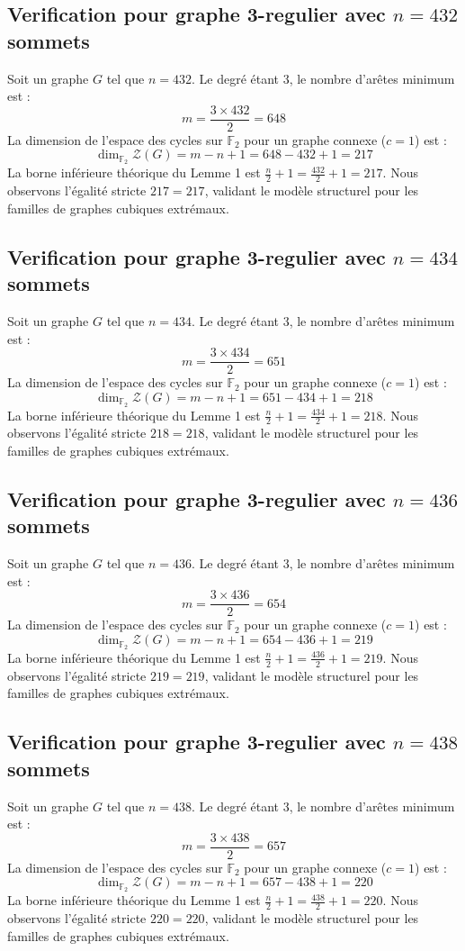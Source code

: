 \documentclass[11pt,a4paper]{article}
\begin{document}
\subsection{Verification pour graphe 3-regulier avec $n=432$ sommets}
Soit un graphe $G$ tel que $n = 432$. Le degré étant 3, le nombre d'arêtes minimum est :
$$ m = \frac{3 \times 432}{2} = 648 $$
La dimension de l'espace des cycles sur $\mathbb{F}_2$ pour un graphe connexe ($c=1$) est :
$$ \dim_{\mathbb{F}_2} \mathcal{Z}(G) = m - n + 1 = 648 - 432 + 1 = 217 $$
La borne inférieure théorique du Lemme 1 est $\frac{n}{2} + 1 = \frac{432}{2} + 1 = 217$.
Nous observons l'égalité stricte $217 = 217$, validant le modèle structurel pour les familles de graphes cubiques extrémaux.

\subsection{Verification pour graphe 3-regulier avec $n=434$ sommets}
Soit un graphe $G$ tel que $n = 434$. Le degré étant 3, le nombre d'arêtes minimum est :
$$ m = \frac{3 \times 434}{2} = 651 $$
La dimension de l'espace des cycles sur $\mathbb{F}_2$ pour un graphe connexe ($c=1$) est :
$$ \dim_{\mathbb{F}_2} \mathcal{Z}(G) = m - n + 1 = 651 - 434 + 1 = 218 $$
La borne inférieure théorique du Lemme 1 est $\frac{n}{2} + 1 = \frac{434}{2} + 1 = 218$.
Nous observons l'égalité stricte $218 = 218$, validant le modèle structurel pour les familles de graphes cubiques extrémaux.

\subsection{Verification pour graphe 3-regulier avec $n=436$ sommets}
Soit un graphe $G$ tel que $n = 436$. Le degré étant 3, le nombre d'arêtes minimum est :
$$ m = \frac{3 \times 436}{2} = 654 $$
La dimension de l'espace des cycles sur $\mathbb{F}_2$ pour un graphe connexe ($c=1$) est :
$$ \dim_{\mathbb{F}_2} \mathcal{Z}(G) = m - n + 1 = 654 - 436 + 1 = 219 $$
La borne inférieure théorique du Lemme 1 est $\frac{n}{2} + 1 = \frac{436}{2} + 1 = 219$.
Nous observons l'égalité stricte $219 = 219$, validant le modèle structurel pour les familles de graphes cubiques extrémaux.

\subsection{Verification pour graphe 3-regulier avec $n=438$ sommets}
Soit un graphe $G$ tel que $n = 438$. Le degré étant 3, le nombre d'arêtes minimum est :
$$ m = \frac{3 \times 438}{2} = 657 $$
La dimension de l'espace des cycles sur $\mathbb{F}_2$ pour un graphe connexe ($c=1$) est :
$$ \dim_{\mathbb{F}_2} \mathcal{Z}(G) = m - n + 1 = 657 - 438 + 1 = 220 $$
La borne inférieure théorique du Lemme 1 est $\frac{n}{2} + 1 = \frac{438}{2} + 1 = 220$.
Nous observons l'égalité stricte $220 = 220$, validant le modèle structurel pour les familles de graphes cubiques extrémaux.
\end{document}
